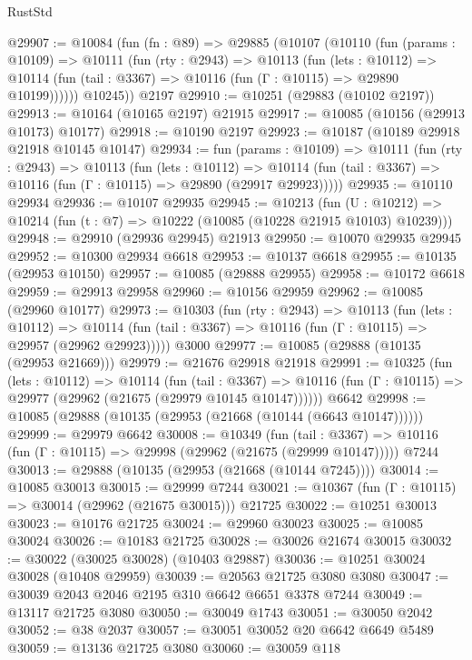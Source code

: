 \begin{lexlean}{RustStd}
\begin{coremodule}
@29907 := @10084
    (fun (fn : @89) =>
    @29885
      (@10107
        (@10110
          (fun (params : @10109) =>
          @10111
            (fun (rty : @2943) =>
            @10113
              (fun (lets : @10112) =>
              @10114 (fun (tail : @3367) => @10116 (fun (Γ : @10115) => @29890 @10199))))))
        @10245))
    @2197
@29910 := @10251 (@29883 (@10102 @2197))
@29913 := @10164 (@10165 @2197) @21915
@29917 := @10085 (@10156 (@29913 @10173) @10177)
@29918 := @10190 @2197
@29923 := @10187 (@10189 @29918 @21918 @10145 @10147)
@29934 := fun (params : @10109) =>
  @10111
    (fun (rty : @2943) =>
    @10113
      (fun (lets : @10112) =>
      @10114 (fun (tail : @3367) => @10116 (fun (Γ : @10115) => @29890 (@29917 @29923)))))
@29935 := @10110 @29934
@29936 := @10107 @29935
@29945 := @10213
    (fun (U : @10212) => @10214 (fun (t : @7) => @10222 (@10085 (@10228 @21915 @10103) @10239)))
@29948 := @29910 (@29936 @29945) @21913
@29950 := @10070 @29935 @29945
@29952 := @10300 @29934 @6618
@29953 := @10137 @6618
@29955 := @10135 (@29953 @10150)
@29957 := @10085 (@29888 @29955)
@29958 := @10172 @6618
@29959 := @29913 @29958
@29960 := @10156 @29959
@29962 := @10085 (@29960 @10177)
@29973 := @10303
    (fun (rty : @2943) =>
    @10113
      (fun (lets : @10112) =>
      @10114 (fun (tail : @3367) => @10116 (fun (Γ : @10115) => @29957 (@29962 @29923)))))
    @3000
@29977 := @10085 (@29888 (@10135 (@29953 @21669)))
@29979 := @21676 @29918 @21918
@29991 := @10325
    (fun (lets : @10112) =>
    @10114
      (fun (tail : @3367) =>
      @10116 (fun (Γ : @10115) => @29977 (@29962 (@21675 (@29979 @10145 @10147))))))
    @6642
@29998 := @10085 (@29888 (@10135 (@29953 (@21668 (@10144 (@6643 @10147))))))
@29999 := @29979 @6642
@30008 := @10349
    (fun (tail : @3367) => @10116 (fun (Γ : @10115) => @29998 (@29962 (@21675 (@29999 @10147)))))
    @7244
@30013 := @29888 (@10135 (@29953 (@21668 (@10144 @7245))))
@30014 := @10085 @30013
@30015 := @29999 @7244
@30021 := @10367 (fun (Γ : @10115) => @30014 (@29962 (@21675 @30015))) @21725
@30022 := @10251 @30013
@30023 := @10176 @21725
@30024 := @29960 @30023
@30025 := @10085 @30024
@30026 := @10183 @21725
@30028 := @30026 @21674 @30015
@30032 := @30022 (@30025 @30028) (@10403 @29887)
@30036 := @10251 @30024 @30028 (@10408 @29959)
@30039 := @20563 @21725 @3080 @3080
@30047 := @30039 @2043 @2046 @2195 @310 @6642 @6651 @3378 @7244
@30049 := @13117 @21725 @3080
@30050 := @30049 @1743
@30051 := @30050 @2042
@30052 := @38 @2037
@30057 := @30051 @30052 @20 @6642 @6649 @5489
@30059 := @13136 @21725 @3080
@30060 := @30059 @118

\end{coremodule}
\end{lexlean}
